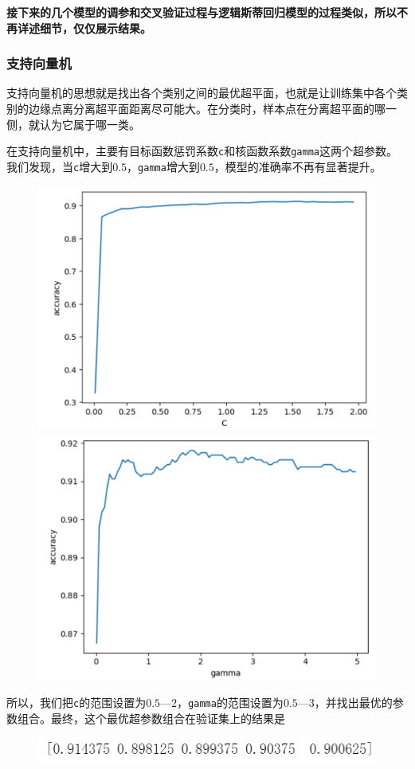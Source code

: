 \documentclass{article}
\begin{document}
\textbf{接下来的几个模型的调参和交叉验证过程与逻辑斯蒂回归模型的过程类似，所以不再详述细节，仅仅展示结果。}

\subsubsection{支持向量机}
支持向量机的思想就是找出各个类别之间的最优超平面，也就是让训练集中各个类别的边缘点离分离超平面距离尽可能大。在分类时，样本点在分离超平面的哪一侧，就认为它属于哪一类。

在支持向量机中，主要有目标函数惩罚系数\lstinline|c|和核函数系数\lstinline|gamma|这两个超参数。我们发现，当\lstinline|c|增大到$0.5$，\lstinline|gamma|增大到$0.5$，模型的准确率不再有显著提升。
\newpage
\begin{figure}[h]
    \lefting
    \includegraphics[width=0.5\linewidth]{image3.png}
    \label{fig:enter-label}
    \righting
    \includegraphics[width=0.5\linewidth]{image4.png}
    \label{fig:enter-label}
\end{figure}

所以，我们把\lstinline|c|的范围设置为$0.5$—$2$，\lstinline|gamma|的范围设置为$0.5$—$3$，并找出最优的参数组合。最终，这个最优超参数组合在验证集上的结果是
\begin{figure}[h]
    \centering
    \includegraphics[width=0.5\linewidth]{image5.png}
    \label{fig:enter-label}
\end{figure}
\end{document}
